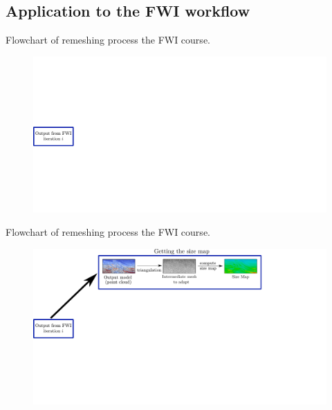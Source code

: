 \subsection{Application to the FWI workflow}
\begin{frame}{Flowchart of remeshing process the FWI course.}

  \begin{figure}[htbp!]
    \vspace{-0.7cm}
  \centering
  \includegraphics[scale=0.36]{image/remesh_workflow0.pdf}
  \label{flowchart_remesh}
\end{figure}
\end{frame}

\begin{frame}[noframenumbering]{Flowchart of remeshing process the FWI course.}

  \begin{figure}[htbp!]
    \vspace{-0.7cm}
  \centering
  \includegraphics[scale=0.36]{image/remesh_workflow1.pdf}
  \label{flowchart_remesh}
\end{figure}
\end{frame}


